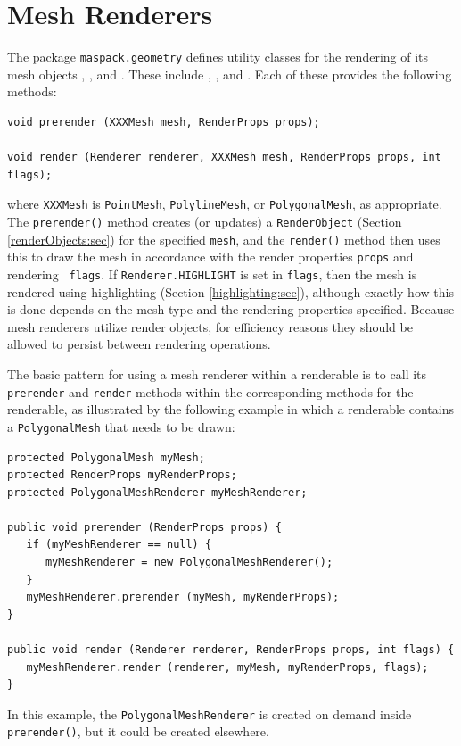 \section{Mesh Renderers}
\label{meshRendering:sec}

The package {\tt maspack.geometry} defines utility classes for the
rendering of its mesh objects
,
, and
.
These include
,
, and
.
Each of these provides the following methods:
%
\begin{lstlisting}[]
void prerender (XXXMesh mesh, RenderProps props);

void render (Renderer renderer, XXXMesh mesh, RenderProps props, int flags);
\end{lstlisting}
%
where {\tt XXXMesh} is {\tt PointMesh}, {\tt PolylineMesh}, or 
{\tt PolygonalMesh}, as appropriate.
The {\tt prerender()} method creates (or updates) a {\tt RenderObject}
(Section \ref{renderObjects:sec}) for the specified {\tt mesh}, and
the {\tt render()} method then uses this to draw the mesh in
accordance with the render properties {\tt props} and rendering {\tt
flags}.  If {\tt Renderer.HIGHLIGHT} is set in {\tt flags}, then the
mesh is rendered using highlighting (Section \ref{highlighting:sec}),
although exactly how this is done depends on the mesh type and the
rendering properties specified.  Because mesh renderers utilize
render objects, for efficiency reasons they should be allowed to
persist between rendering operations.

The basic pattern for using a mesh renderer within a renderable is to
call its {\tt prerender} and {\tt render} methods within the
corresponding methods for the renderable, as illustrated by the
following example in which a renderable contains a {\tt PolygonalMesh}
that needs to be drawn:
%
\begin{lstlisting}[]
protected PolygonalMesh myMesh;
protected RenderProps myRenderProps;
protected PolygonalMeshRenderer myMeshRenderer;

public void prerender (RenderProps props) {
   if (myMeshRenderer == null) {
      myMeshRenderer = new PolygonalMeshRenderer();
   }
   myMeshRenderer.prerender (myMesh, myRenderProps);
}

public void render (Renderer renderer, RenderProps props, int flags) {
   myMeshRenderer.render (renderer, myMesh, myRenderProps, flags);
}
\end{lstlisting}
%
In this example, the {\tt PolygonalMeshRenderer} is created on demand
inside {\tt prerender()}, but it could be created elsewhere.

